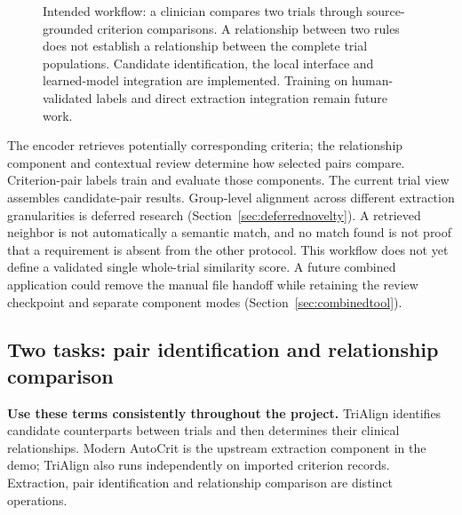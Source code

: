 \documentclass[10pt,letterpaper]{article}
\begin{document}
\begin{figure}[htbp]
\centering
{}
\caption{Intended workflow: a clinician compares two trials through
source-grounded criterion comparisons. A relationship between two rules
does not establish a relationship between the complete trial populations.
Candidate identification, the local interface and learned-model integration
are implemented. Training on human-validated labels and direct extraction
integration remain future work.}
\label{fig:trialworkflow}
\end{figure}

The encoder retrieves potentially corresponding criteria; the relationship
component and contextual review determine how selected pairs compare.
Criterion-pair labels train and evaluate those components. The current trial view assembles candidate-pair results. Group-level alignment
across different extraction granularities is deferred research
(Section~\ref{sec:deferrednovelty}). A retrieved neighbor is not automatically
a semantic match, and no match found is not proof that a requirement is
absent from the other protocol. This workflow does not yet define a validated
single whole-trial similarity score. A future combined application could
remove the manual file handoff while retaining the review checkpoint and
separate component modes (Section~\ref{sec:combinedtool}).

\subsection{Two tasks: pair identification and relationship comparison}
\label{sec:twotasks}
\textbf{Use these terms consistently throughout the project.} TriAlign identifies
candidate counterparts between trials and then determines their clinical
relationships. Modern AutoCrit is the upstream extraction component in the
demo; TriAlign also runs independently on imported criterion records. Extraction,
pair identification and relationship comparison are distinct operations.
\end{document}
